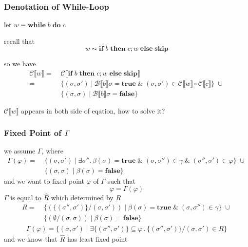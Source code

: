 \documentclass[12pt,aspectratio=169]{beamer}
\newcommand{\denoB}[1]{\mathcal{B} \llbracket #1 \rrbracket}
\newcommand{\denoC}[1]{\mathcal{C} \llbracket #1 \rrbracket}
\newcommand{\true}{\mathbf{true}}
\newcommand{\false}{\mathbf{false}}
\newcommand{\Skip}{\mathbf{skip}}
\newcommand{\ITE}[3]{\mathbf{if}\; #1 \; \mathbf{then} \; #2 \; \mathbf{else} \; #3}
\newcommand{\While}[2]{\mathbf{while}\; #1 \; \mathbf{do} \; #2}
\begin{document}
\begin{frame}
    \frametitle{Denotation of While-Loop}
    let $w \equiv \While{b}{c}$

    recall that
    \[
        w \sim \ITE{b}{c;w}{\Skip}
    \]

    so we have
    \begin{align*}
        \denoC{w} = & \; \denoC{\ITE{b}{c;w}{\Skip}}\\
            = & \; \{(\sigma, \sigma') \mid \denoB{b}\sigma = \true \; \& \; (\sigma, \sigma') \in \denoC{w} \circ \denoC{c}\} \; \cup \\
            & \; \{ (\sigma,\sigma) \mid \denoB{b}\sigma = \false \}
    \end{align*}

    $\denoC{w}$ appears in both side of eqation, how to solve it?
    
\end{frame}

\begin{frame}
    \frametitle{Fixed Point of $\Gamma$}
    we assume $\Gamma$, where
        \begin{align*}
            \Gamma(\varphi) %
                            = & \; \{(\sigma, \sigma') \mid \exists \sigma'' .\, \beta(\sigma) = \true \; \& \; (\sigma, \sigma'') \in \gamma \; \& \; (\sigma'', \sigma') \in \varphi\} \; \cup \\
                            & \; \{(\sigma,\sigma) \mid \beta(\sigma) = \false \}
        \end{align*}
    and we want to fixed point $\varphi$ of $\Gamma$ such that
    \[
        \varphi = \Gamma(\varphi)
    \]
    $\Gamma$ is equal to $\widehat{R}$ which determined by $R$
    \begin{align*}
        R = & \; \{ (\{(\sigma'', \sigma')\} / (\sigma, \sigma')) \mid \beta(\sigma) = \true \; \& \; (\sigma, \sigma'') \in \gamma\}\; \cup \\
        & \; \{(\emptyset / (\sigma,\sigma)) \mid \beta(\sigma) = \false \}
    \end{align*}
    \begin{align*}
        \Gamma(\varphi) = \{(\sigma,\sigma') \mid \exists \{(\sigma'',\sigma')\} \subseteq \varphi \, . \, \{(\sigma'',\sigma')\} / (\sigma, \sigma') \in R \}
    \end{align*}
    and we know that $\widehat{R}$ has least fixed point
\end{frame}
\end{document}
